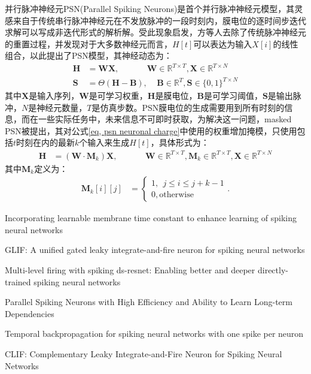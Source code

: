 \documentclass{SCIS2020cn}
\begin{document}
并行脉冲神经元PSN(Parallel Spiking Neurons)是首个并行脉冲神经元模型，其灵感来自于传统串行脉冲神经元在不发放脉冲的一段时刻内，膜电位的逐时间步迭代求解可以写成非迭代形式的解析解。受此现象启发，方等人去除了传统脉冲神经元的重置过程，并发现对于大多数神经元而言，$H[t]$可以表达为输入$X[i]$的线性组合，以此提出了PSN模型，其神经动态为：
\begin{eqnarray}
	\bm{H} &= \bm{W}\bm{X}, ~~~~~~~~~~~~~~~\bm{W} \in \mathbb{R}^{T \times T}, \bm{X} \in \mathbb{R}^{T \times N} \label{eq, psn neuronal charge}\\
	\bm{S} &= \Theta(\bm{H} - \bm{B}), ~~~~~\bm{B} \in \mathbb{R}^{T}, \bm{S}\in \{0, 1\}^{T \times N}
\end{eqnarray}
其中$\bm{X}$是输入序列，$\bm{W}$是可学习权重，$\bm{H}$是膜电位，$\bm{B}$是可学习阈值，$\bm{S}$是输出脉冲，$N$是神经元数量，$T$是仿真步数。PSN膜电位的生成需要用到所有时刻的信息，而在一些实际任务中，未来信息不可即时获取，为解决这一问题，masked PSN被提出，其对公式\ref{eq, psn neuronal charge}中使用的权重增加掩模，只使用包括$t$时刻在内的最新$k$个输入来生成$H[t]$，具体形式为：
\begin{eqnarray}
	\bm{H} &= (\bm{W} \cdot \bm{M}_{k})\bm{X}, ~~~~~~~~~~~~~~~\bm{W} \in \mathbb{R}^{T \times T}, \bm{M}_{k} \in \mathbb{R}^{T \times T}, \bm{X} \in \mathbb{R}^{T \times N}
\end{eqnarray}
其中$\bm{M}_{k}$定义为：
\begin{eqnarray}
	\bm{M}_{k}[i][j] &= \begin{cases}
		1, ~~ j \leq i \leq j + k - 1 \\
		0, \mathrm{otherwise}
	\end{cases}.
\end{eqnarray}


Incorporating learnable membrane time constant to enhance learning of spiking neural networks

GLIF: A unified gated leaky integrate-and-fire neuron for spiking neural networks

Multi-level firing with spiking ds-resnet: Enabling better and deeper directly-trained spiking neural networks

Parallel Spiking Neurons with High Efficiency and Ability to Learn Long-term Dependencies

Temporal backpropagation for spiking neural networks with one spike per neuron

CLIF: Complementary Leaky Integrate-and-Fire Neuron for Spiking Neural Networks
\end{document}
